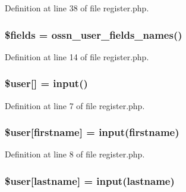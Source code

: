 Definition at line 38 of file register.\+php.

\subsubsection[{\texorpdfstring{\$fields}{$fields}}]{\setlength{\rightskip}{0pt plus 5cm}\$fields = {\bf ossn\+\_\+user\+\_\+fields\+\_\+names}()}\hypertarget{register_8php_ab2303c817e3b402b77b7f99627b9c319}{}\label{register_8php_ab2303c817e3b402b77b7f99627b9c319}


Definition at line 14 of file register.\+php.

\subsubsection[{\texorpdfstring{\$user}{$user}}]{\setlength{\rightskip}{0pt plus 5cm}\${\bf user}\mbox{[}\textquotesingle{}\mbox{]} = {\bf input}(\textquotesingle{})}\hypertarget{register_8php_a48c184d1487bdbc0b0d2fe6e1521dd7d}{}\label{register_8php_a48c184d1487bdbc0b0d2fe6e1521dd7d}


Definition at line 7 of file register.\+php.

\subsubsection[{\texorpdfstring{\$user}{$user}}]{\setlength{\rightskip}{0pt plus 5cm}\${\bf user}\mbox{[}\textquotesingle{}firstname\textquotesingle{}\mbox{]} = {\bf input}(\textquotesingle{}firstname\textquotesingle{})}\hypertarget{register_8php_a3c8ba9ea696968574370c51a90ff638c}{}\label{register_8php_a3c8ba9ea696968574370c51a90ff638c}


Definition at line 8 of file register.\+php.

\subsubsection[{\texorpdfstring{\$user}{$user}}]{\setlength{\rightskip}{0pt plus 5cm}\${\bf user}\mbox{[}\textquotesingle{}lastname\textquotesingle{}\mbox{]} = {\bf input}(\textquotesingle{}lastname\textquotesingle{})}\hypertarget{register_8php_a1187774c6d9942181216e0839e5e73bc}{}\label{register_8php_a1187774c6d9942181216e0839e5e73bc}


